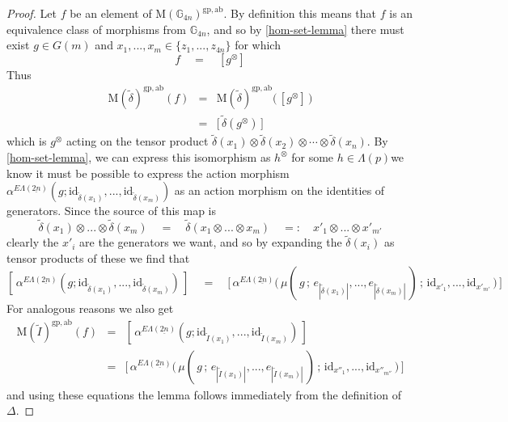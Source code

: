 \documentclass{amsbook} %
\newcommand{\ELnn}{E\Lambda(\underline{2n})}
\numberwithin{section}{chapter}
\begin{document}
\begin{proof}  
Let $f$ be an element of $\mathrm{M}(\mathbb{G}_{4n})^{\mathrm{gp, ab}}$. By definition this means that $f$ is an equivalence class of morphisms from $\mathbb{G}_{4n}$, and so by \cref{hom-set-lemma} there must exist $g \in G(m)$ and $x_1, ..., x_m \in \{ z_1, ..., z_{4n} \}$ for which
\[ f \quad = \quad [g^{\otimes} ] \]
Thus
\[ \begin{array}{rll}
			\mathrm{M}(\tilde{\delta})^{\mathrm{gp, ab}}(f) & = & \mathrm{M}(\tilde{\delta})^{\mathrm{gp, ab}} \big( \, [ g^{\otimes} ] \, \big) \\
			& = & \big[ \, \tilde{\delta}(g^{\otimes}) \, \big]  
		\end{array}
\]
which is $g^{\otimes}$ acting on the tensor product $\tilde{\delta}(x_1) \otimes \tilde{\delta}(x_2) \otimes \cdots \otimes \tilde{\delta}(x_n)$.
By \cref{hom-set-lemma}, we can express this isomorphism as $h^{\otimes}$ for some $h \in \Lambda(p)$we know it must be possible to express the action morphism $\alpha^{\ELnn}(g; \mathrm{id}_{\tilde{\delta}(x_1)}, ..., \mathrm{id}_{\tilde{\delta}(x_m)})$ as an action morphism on the identities of generators. Since the source of this map is
\[ \tilde{\delta}(x_1) \otimes ... \otimes \tilde{\delta}(x_m) \quad = \quad \tilde{\delta}(x_1 \otimes ... \otimes x_m) \quad =: \quad x'_1 \otimes ... \otimes x'_{m'}  \]
clearly the $x'_i$ are the generators we want, and so by expanding the $\tilde{\delta}(x_i)$ as tensor products of these we find that
\[ [ \, \alpha^{\ELnn}(g; \mathrm{id}_{\tilde{\delta}(x_1)}, ..., \mathrm{id}_{\tilde{\delta}(x_m)})  \, ] \quad = \quad \big[ \, \alpha^{\ELnn}\big( \, \mu( \, g \, ; \, e_{|\tilde{\delta}(x_1)|}, ..., e_{|\tilde{\delta}(x_m)|} \, ) \, ; \, \mathrm{id}_{x'_1}, ..., \mathrm{id}_{x'_{m'}} \, \big) \, \big] \]
For analogous reasons we also get
\[ \begin{array}{rll}
			\mathrm{M}(\tilde{I})^{\mathrm{gp, ab}}(f) & = & [ \, \alpha^{\ELnn}(g; \mathrm{id}_{\tilde{I}(x_1)}, ..., \mathrm{id}_{\tilde{I}(x_m)}) \, ]  \\
			& = &  \big[ \, \alpha^{\ELnn}\big( \, \mu( \, g \, ; \, e_{|\tilde{I}(x_1)|}, ..., e_{|\tilde{I}(x_m)|} \, ) \, ; \, \mathrm{id}_{x''_1}, ...,  \mathrm{id}_{x''_{m''}} \, \big) \, \big]
		\end{array}
\]
and using these equations the lemma follows immediately from the definition of $\Delta$.
\end{proof}
\end{document}
